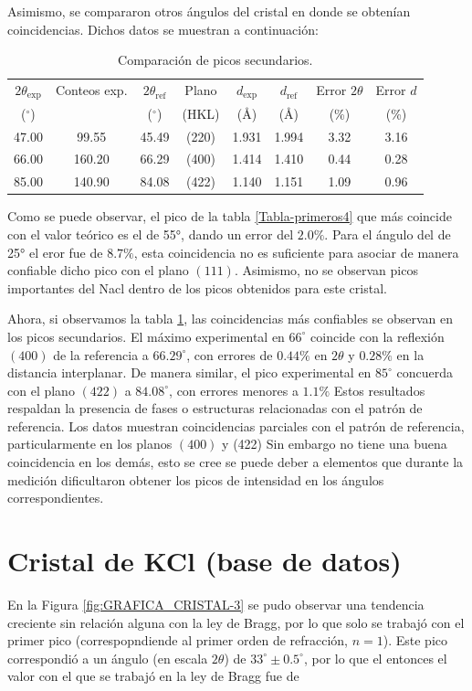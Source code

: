 Asimismo, se compararon otros ángulos del cristal en donde se obtenían coincidencias. Dichos datos se muestran a continuación: 
\begin{table}[H]
	\centering
	\caption{Comparación de picos secundarios.}
	\begin{tabular}{|c| c| c |c| c| c| c| c|}
		\hline
		$2\theta_{\mathrm{exp}}$ & Conteos exp. & $2\theta_{\mathrm{ref}}$ &
		Plano & $d_{\mathrm{exp}}$ & $d_{\mathrm{ref}}$ &
		Error $2\theta$ & Error $d$ \\
		($^\circ$) & & ($^\circ$) & (HKL) & (\AA) & (\AA) & (\%) & (\%) \\
		\hline
		47.00 & 99.55  & 45.49 & (220) & 1.931 & 1.994 & 3.32 & 3.16 \\ \hline
		66.00 & 160.20 & 66.29 & (400) & 1.414 & 1.410 & 0.44 & 0.28 \\ \hline
		85.00 & 140.90 & 84.08 & (422) & 1.140 & 1.151 & 1.09 & 0.96 \\
		\hline
	\end{tabular}
	\label{tabla 2 - 4}
\end{table}
Como se puede observar, el pico de la tabla \ref{Tabla-primeros4} que más coincide con el valor teórico es el de 55°, dando un error del $2.0\%$. Para el ángulo del de 25° el eror fue de $8.7\%$, esta coincidencia no es suficiente para asociar de manera confiable dicho pico con el plano \((111)\). Asimismo, no se observan picos importantes del Nacl dentro de los picos obtenidos para este cristal.

Ahora, si observamos la tabla \ref{tabla 2 - 4}, las coincidencias más confiables se observan en los picos secundarios. El máximo experimental en \(66^\circ\) coincide con la reflexión \((400)\) de la referencia a \(66.29^\circ\), con errores de $0.44 \%$ en \(2\theta\) y $0.28 \%$ en la distancia interplanar. De manera similar, el pico experimental en \(85^\circ\) concuerda con el plano \((422)\) a \(84.08^\circ\), con errores menores a $1.1 \%$ Estos resultados respaldan la presencia de fases o estructuras relacionadas con el patrón de referencia.
Los datos muestran coincidencias parciales con el patrón de referencia, particularmente en los planos \((400)\) y (422) Sin embargo no tiene una buena coincidencia en los demás, esto se cree se puede deber a elementos que durante la medición dificultaron obtener los picos de intensidad en los ángulos correspondientes.

\section{Cristal de KCl (base de datos)} %
\noindent En la Figura \ref{fig:GRAFICA_CRISTAL-3} se pudo observar una tendencia creciente sin relación alguna con la ley de Bragg, por lo que solo se trabajó con el primer pico (correspopndiende al primer orden de refracción, $n=1$). Este pico correspondió a un ángulo (en escala $2\theta$) de $33^\circ \pm 0.5^\circ$, por lo que el entonces el valor con el que se trabajó en la ley de Bragg fue de

